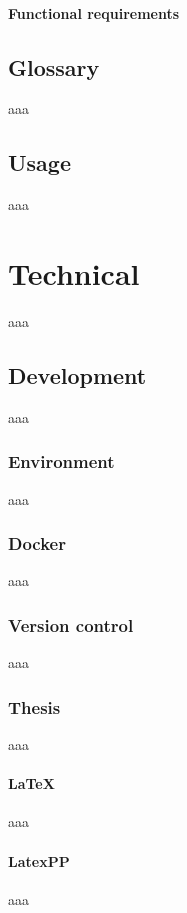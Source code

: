\documentclass[12pt]{report}
\begin{document}
                \subsection{Functional requirements}                    

        \chapter{Glossary}
            aaa

        \chapter{Usage}
            aaa

    \part{Technical}
        aaa

        \chapter{Development}
            aaa

            \section{Environment}
                aaa

            \section{Docker}
                aaa

            \section{Version control}
                aaa

            \section{Thesis}
                aaa

                \subsection{\LaTeX}
                    aaa

                \subsection{LatexPP}
                    aaa
\end{document}
